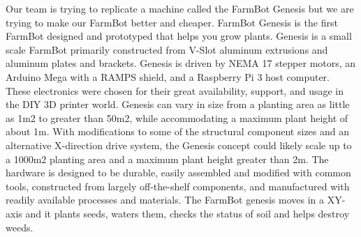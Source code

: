 Our team is trying to replicate a machine called the FarmBot Genesis but we are trying to make our FarmBot better and cheaper. FarmBot Genesis is the first FarmBot designed and prototyped that helps you grow plants. Genesis is a small scale FarmBot primarily constructed from V-Slot aluminum extrusions and aluminum plates and brackets. Genesis is driven by NEMA 17 stepper motors, an Arduino Mega with a RAMPS shield, and a Raspberry Pi 3 host computer. These electronics were chosen for their great availability, support, and usage in the DIY 3D printer world. Genesis can vary in size from a planting area as little as 1m2 to greater than 50m2, while accommodating a maximum plant height of about 1m. With modifications to some of the structural component sizes and an alternative X-direction drive system, the Genesis concept could likely scale up to a 1000m2 planting area and a maximum plant height greater than 2m. The hardware is designed to be durable, easily assembled and modified with common tools, constructed from largely off-the-shelf components, and manufactured with readily available processes and materials. The FarmBot genesis moves in a XY-axis and it plants seeds, waters them, checks the status of soil and helps destroy weeds.